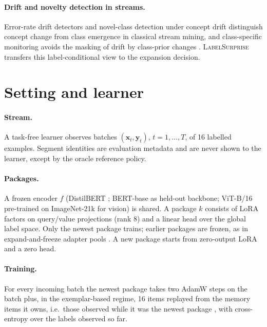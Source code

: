 \documentclass[10pt]{article}
\newcommand{\ls}{\textsc{LabelSurprise}}
\begin{document}
\paragraph{Drift and novelty detection in streams.} Error-rate drift detectors \citep{page1954cusum,gama2004ddm,bifet2007adwin} and novel-class detection under concept drift \citep{masud2011novel} distinguish concept change from class emergence in classical stream mining, and class-specific monitoring avoids the masking of drift by class-prior changes \citep{wang2013ddmoci}. \ls{} transfers this label-conditional view to the expansion decision.

\section{Setting and learner}
\label{sec:setting}

\paragraph{Stream.} A task-free learner observes batches $(\mathbf{x}_t,\mathbf{y}_t)$, $t=1,\dots,T$, of 16 labelled examples. Segment identities are evaluation metadata and are never shown to the learner, except by the oracle reference policy.

\paragraph{Packages.} A frozen encoder $f$ (DistilBERT \citep{sanh2019distilbert}; BERT-base \citep{devlin2019bert} as held-out backbone; ViT-B/16 pre-trained on ImageNet-21k \citep{dosovitskiy2021vit} for vision) is shared. A package $k$ consists of LoRA factors \citep{hu2022lora} on query/value projections (rank 8) and a linear head over the global label space. Only the newest package trains; earlier packages are frozen, as in expand-and-freeze adapter pools \citep{zhou2024ease,wang2025sema}. A new package starts from zero-output LoRA and a zero head.

\paragraph{Training.} For every incoming batch the newest package takes two AdamW steps on the batch plus, in the exemplar-based regime, 16 items replayed from the memory items it owns, i.e.\ those observed while it was the newest package \citep{chaudhry2019tiny}, with cross-entropy over the labels observed so far.
\end{document}
